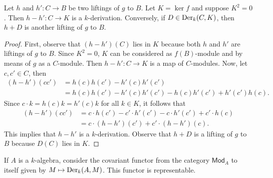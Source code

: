 \begin{lemma}\label{lemm:two-liftings}
	Let $h$ and $h'\colon C \to B$ be two liftings of $g$ to $B$. Let $K = \ker f$ and suppose $K^{2} = 0$. Then $h - h'\colon C \to K$ is a $k$-derivation. Conversely, if $D \in \operatorname{Der}_{k}(C, K)$, then $h + D$ is another lifting of $g$ to $B$.
\end{lemma}
\begin{proof}
	First, observe that $(h - h')(C)$ lies in $K$ because both $h$ and $h'$ are liftings of $g$ to $B$. Since $K^{2} = 0$, $K$ can be considered as $f(B)$-module and by means of $g$ as a $C$-module. Then $h-h'\colon C \to K$ is a map of $C$-modules. Now, let $c,c' \in C$, then
	\begin{align*}
	(h -h')(cc') &= h(c)h(c') - h'(c)h'(c') \\
	&= h(c)h(c') - h'(c)h'(c') - h(c)h'(c') + h'(c')h(c).
	\end{align*}
	Since $c \cdot k = h(c)k = h'(c)k$ for all $k \in K$, it follows that
	\begin{align*}
		(h -h')(cc') &= c\cdot h(c') - c'\cdot h'(c') - c\cdot h'(c') + c'\cdot h(c) \\
		&= c\cdot (h - h')(c') + c'\cdot (h - h')(c).
	\end{align*}
	This implies that $h - h'$ is a $k$-derivation. Observe that $h + D$ is a lifting of $g$ to $B$ because $D(C)$ lies in $K$.
\end{proof}
\begin{theorem}\label{prop:differentials-representable-functor}
	If $A$ is a $k$-algebra, consider the covariant functor from the category $\mathsf{Mod}_{A}$ to itself given by $M \mapsto \operatorname{Der}_{k}(A,M)$. This functor is representable. 
\end{theorem}
